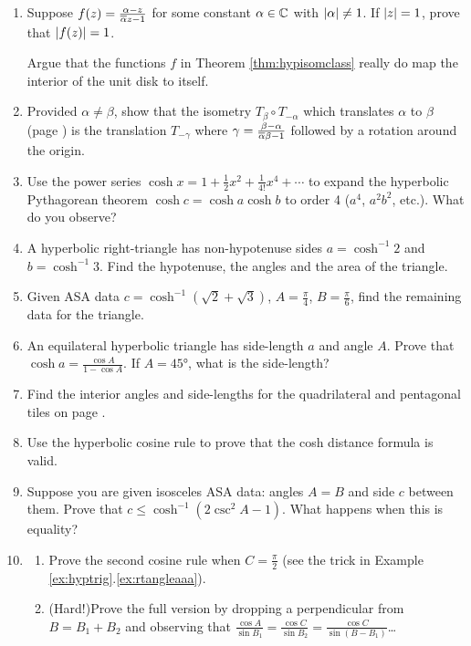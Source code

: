 \begin{exercises}
\begin{enumerate}
	  
	  \item Suppose $f(z)=\frac{\alpha-z}{\overline{\alpha} z-1}$ for some constant $\alpha\in\mathbb{C}$ with $\left| \alpha\right|\neq 1$. If $\left| z\right|=1$, prove that $\left| f(z)\right|=1$.\par
	  Argue that the functions $f$ in Theorem \ref{thm:hypisomclass} really do map the interior of the unit disk to itself.
	  
	  
 		\item Provided $\alpha\neq\beta$, show that the isometry $T_\beta\circ T_{-\alpha}$ which translates $\alpha$ to $\beta$ (page \pageref{pg:hypisomclass}) is the translation $T_{-\gamma}$ where $\gamma=\frac{\beta-\alpha}{\overline{\alpha}\beta-1}$ followed by a rotation around the origin.
	
	  
		\item Use the power series $\cosh x=1+\frac 12x^2+\frac 1{4!}x^4+\cdots$ to expand the hyperbolic Pythagorean theorem $\cosh c=\cosh a\cosh b$ to order 4 ($a^4$, $a^2b^2$, etc.). What do you observe?
	
	  
	  \item A hyperbolic right-triangle has non-hypotenuse sides $a=\cosh^{-1}2$ and $b=\cosh^{-1}3$. Find the hypotenuse, the angles and the area of the triangle.
	  
	  
		\item Given ASA data $c=\cosh^{-1}(\sqrt 2+\sqrt 3)$, $A=\frac\pi 4$, $B=\frac\pi 6$, find the remaining data for the triangle.
	  
	  
		\item An equilateral hyperbolic triangle has side-length $a$ and angle $A$. Prove that $\cosh a =\frac{\cos A}{1-\cos A}$. If $A=\ang{45}$, what is the side-length?
		
		
		\item Find the interior angles and side-lengths for the quadrilateral and pentagonal tiles on page \pageref{pg:hyptiling}.
		
		 
		\item Use the hyperbolic cosine rule to prove that the cosh distance formula is valid.
	
		
		\item Suppose you are given isosceles ASA data: angles $A=B$ and side $c$ between them. Prove that $c\le\cosh^{-1}(2\csc^2A-1)$. What happens when this is equality?
		
				
 		\item\label{exs:hcosruleII}
 		\begin{enumerate}
		  \item Prove the second cosine rule when $C=\frac\pi 2$ (see the trick in Example \ref*{ex:hyptrig}.\ref{ex:rtangleaaa}).
		  \item (Hard!)\lstsp Prove the full version by dropping a perpendicular from $B=B_1+B_2$ and observing that $\frac{\cos A}{\sin B_1}=\frac{\cos C}{\sin B_2}=\frac{\cos C}{\sin(B-B_1)}$\ldots
		\end{enumerate}
	\end{enumerate}
\end{exercises}

